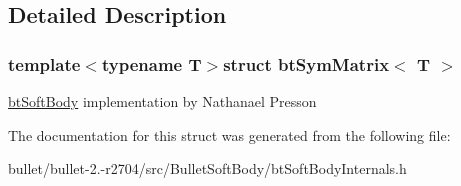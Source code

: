 \subsection{Detailed Description}
\subsubsection*{template$<$typename T$>$struct bt\+Sym\+Matrix$<$ T $>$}

\hyperlink{classbt_soft_body}{bt\+Soft\+Body} implementation by Nathanael Presson 

The documentation for this struct was generated from the following file\+:\begin{DoxyCompactItemize}
\item 
bullet/bullet-\/2.-\/r2704/src/\+Bullet\+Soft\+Body/bt\+Soft\+Body\+Internals.\+h\end{DoxyCompactItemize}
